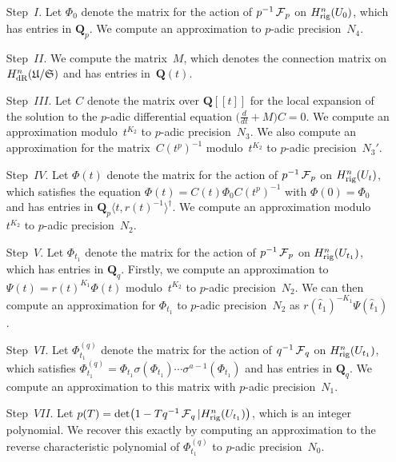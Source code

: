 \begin{enumerate}
\item[Step~$I$.]
Let $\Phi_0$ denote the matrix for the action of $p^{-1} \operatorname{\mathcal{F}}_p$ on 
$H_{\text{rig}}^{n}(U_0)$, which has entries in $\mathbf{Q}_p$.  
We compute an approximation to $p$-adic precision~$N_4$.
\item[Step~$II$.]
We compute the matrix~$M$, which denotes the connection matrix 
on $H_{\text{dR}}^{n}(\mathfrak{U}/\mathfrak{S})$ and has entries in~$\mathbf{Q}(t)$.
\item[Step~$III$.]
Let $C$ denote the matrix over $\mathbf{Q}[[t]]$ for the local 
expansion of the solution to the $p$-adic differential equation 
$\bigl(\tfrac{d}{dt} + M\bigr) C = 0$.  We compute an approximation 
modulo~$t^{K_2}$ to $p$-adic precision~$N_3$.  We also compute an 
approximation for the matrix~$C(t^p)^{-1}$ modulo~$t^{K_2}$ to $p$-adic 
precision~$N_3'$.
\item[Step~$IV$.]
Let $\Phi(t)$ denote the matrix for the action of $p^{-1} \operatorname{\mathcal{F}}_p$ on 
$H_{\text{rig}}^{n}(U_t)$, which satisfies the equation 
$\Phi(t) = C(t) \Phi_0 C(t^p)^{-1}$ with $\Phi(0) = \Phi_0$ and has 
entries in $\mathbf{Q}_p\langle t,r(t)^{-1}\rangle^{\dagger}$.  We 
compute an approximation modulo~$t^{K_2}$ to $p$-adic precision~$N_2$.
\item[Step~$V$.]
Let $\Phi_{t_1}$ denote the matrix for the action of $p^{-1} \operatorname{\mathcal{F}}_p$ 
on $H_{\text{rig}}^{n}(U_{t_1})$, which has entries in $\mathbf{Q}_q$. 
Firstly, we compute an approximation to $\Psi(t) = r(t)^{K_1} \Phi(t)$ 
modulo~$t^{K_2}$ to $p$-adic precision~$N_2$.  We can then compute an 
approximation for $\Phi_{t_1}$ to $p$-adic precision~$N_2$ as 
$r(\hat{t}_1)^{-K_1} \Psi(\hat{t}_1)$.
\item[Step~$VI$.]
Let $\Phi_{t_1}^{(q)}$ denote the matrix for the action of $q^{-1} \operatorname{\mathcal{F}}_q$ on 
$H_{\text{rig}}^{n}(U_{t_1})$, which satisfies 
$\Phi_{t_1}^{(q)} = \Phi_{t_1} \sigma(\Phi_{t_1}) \dotsm \sigma^{a-1}(\Phi_{t_1})$ 
and has entries in $\mathbf{Q}_q$.  We compute an approximation to this 
matrix with $p$-adic precision~$N_1$.
\item[Step~$VII$.]
Let $p(T) = \det\bigl(1 - T q^{-1} \operatorname{\mathcal{F}}_q | H_{\text{rig}}^n(U_{t_1})\bigr)$, 
which is an integer polynomial.  We recover this exactly 
by computing an approximation to the reverse characteristic polynomial 
of $\Phi_{t_1}^{(q)}$ to $p$-adic precision~$N_0$.
\end{enumerate}

